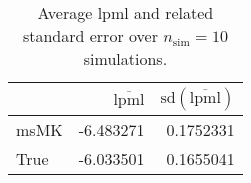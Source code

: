 \begin{table}[H]

\caption{Average lpml and related standard error over $n_{\text{sim}} = 10$ simulations.}
\centering
\begin{tabular}[t]{lrr}
\toprule
  & $\overbar{\text{lpml}}$ & $\text{sd}(\overbar{\text{lpml}})$\\
\midrule
msMK & -6.483271 & 0.1752331\\
True & -6.033501 & 0.1655041\\
\bottomrule
\end{tabular}
\end{table}